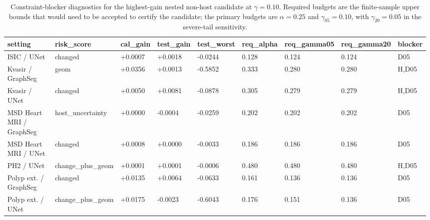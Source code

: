 \begin{table}[t]
\centering
\small
\caption{Constraint-blocker diagnostics for the highest-gain nested non-host candidate at $\gamma=0.10$. Required budgets are the finite-sample upper bounds that would need to be accepted to certify the candidate; the primary budgets are $\alpha=0.25$ and $\gamma_{05}=0.10$, with $\gamma_{20}=0.05$ in the severe-tail sensitivity.}
\label{tab:nested_constraint_blockers}
\begin{tabular}{lllllllll}
\toprule
setting & risk\_score & cal\_gain & test\_gain & test\_worst & req\_alpha & req\_gamma05 & req\_gamma20 & blocker \\
\midrule
ISIC / UNet & changed & +0.0007 & +0.0018 & -0.0244 & 0.128 & 0.124 & 0.124 & D05 \\
Kvasir / GraphSeg & geom & +0.0356 & +0.0013 & -0.5852 & 0.333 & 0.280 & 0.280 & H,D05 \\
Kvasir / UNet & changed & +0.0050 & +0.0081 & -0.0878 & 0.305 & 0.279 & 0.279 & H,D05 \\
MSD Heart MRI / GraphSeg & host\_uncertainty & +0.0000 & -0.0004 & -0.0259 & 0.202 & 0.202 & 0.202 & D05 \\
MSD Heart MRI / UNet & changed & +0.0008 & +0.0000 & -0.0033 & 0.186 & 0.186 & 0.186 & D05 \\
PH2 / UNet & change\_plus\_geom & +0.0001 & +0.0001 & -0.0006 & 0.480 & 0.480 & 0.480 & H,D05 \\
Polyp ext. / GraphSeg & changed & +0.0135 & +0.0064 & -0.0633 & 0.161 & 0.136 & 0.136 & D05 \\
Polyp ext. / UNet & change\_plus\_geom & +0.0175 & -0.0023 & -0.6043 & 0.176 & 0.151 & 0.136 & D05 \\
\bottomrule
\end{tabular}
\end{table}
